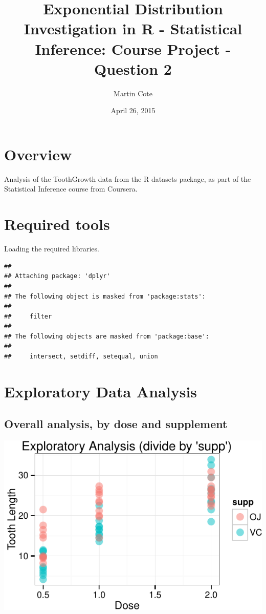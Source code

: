 \documentclass[]{article}
\title{Exponential Distribution Investigation in R - Statistical Inference:
Course Project - Question 2}
\author{Martin Cote}
\date{April 26, 2015}
\begin{document}
\maketitle


\section{Overview}\label{overview}

Analysis of the ToothGrowth data from the R datasets package, as part of
the Statistical Inference course from Coursera.

\section{Required tools}\label{required-tools}

Loading the required libraries.

\begin{verbatim}
## 
## Attaching package: 'dplyr'
## 
## The following object is masked from 'package:stats':
## 
##     filter
## 
## The following objects are masked from 'package:base':
## 
##     intersect, setdiff, setequal, union
\end{verbatim}

\section{Exploratory Data Analysis}\label{exploratory-data-analysis}

\subsection{Overall analysis, by dose and
supplement}\label{overall-analysis-by-dose-and-supplement}

\includegraphics{statinference-courseproject-1-Question-2_files/figure-latex/unnamed-chunk-2-1.pdf}
\end{document}
